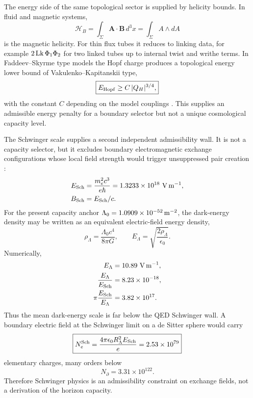 \documentclass[aps,prd,reprint,nofootinbib,superscriptaddress,floatfix]{revtex4-2}
\numberwithin{equation}{section}
\theoremstyle{definition}
\theoremstyle{plain}
\begin{document}
The energy side of the same topological sector is supplied by helicity
bounds.  In fluid and magnetic systems,
\[
\mathcal H_B=\int_{\Sigma} \mathbf A\cdot\mathbf B\,d^3x
             =\int_{\Sigma} A\wedge dA
\]
is the magnetic helicity.  For thin flux tubes it reduces to linking
data, for example \(2\,{\rm Lk}\,\Phi_1\Phi_2\) for two linked tubes
up to internal twist and writhe terms.  In Faddeev--Skyrme type models
the Hopf charge produces a topological energy lower bound of
Vakulenko--Kapitanskii type,
\begin{equation}
\boxed{
E_{\rm Hopf}\ge C\,|Q_H|^{3/4},
}
\end{equation}
with the constant \(C\) depending on the model couplings \cite{Vakulenko1979,Harland2014}.  This supplies
an admissible energy penalty for a boundary selector but not a unique
cosmological capacity level.

The Schwinger scale supplies a second independent admissibility wall.  It
is not a capacity selector, but it excludes boundary electromagnetic
exchange configurations whose local field strength would trigger
unsuppressed pair creation \cite{Schwinger1951,Dunne2009}:
\begin{align}
E_{\rm Sch}
&=
\frac{m_e^2c^3}{e\hbar}
=
1.3233\times10^{18}\ {\rm V\,m^{-1}},
\\
B_{\rm Sch}&=E_{\rm Sch}/c .
\end{align}
For the present capacity anchor \(\Lambda_0=1.0909\times10^{-52}\,{\rm
m^{-2}}\), the dark-energy density may be written as an equivalent
electric-field energy density,
\[
\rho_\Lambda=\frac{\Lambda_0c^4}{8\pi G},
\qquad
E_\Lambda=\sqrt{\frac{2\rho_\Lambda}{\epsilon_0}} .
\]
Numerically,
\begin{align}
E_\Lambda&=10.89\ {\rm V\,m^{-1}},
\\
\frac{E_\Lambda}{E_{\rm Sch}}
&=8.23\times10^{-18},
\\
\pi\frac{E_{\rm Sch}}{E_\Lambda}
&=3.82\times10^{17}.
\end{align}
Thus the mean dark-energy scale is far below the QED Schwinger wall.
A boundary electric field at the Schwinger limit on a de Sitter sphere
would carry
\begin{equation}
\boxed{
N_e^{\rm Sch}
=
\frac{4\pi\epsilon_0R_\Lambda^2E_{\rm Sch}}{e}
=
2.53\times10^{79}
}
\end{equation}
elementary charges, many orders below
\[
N_\partial=3.31\times10^{122}.
\]
Therefore Schwinger physics is an admissibility constraint on exchange
fields, not a derivation of the horizon capacity.
\end{document}

